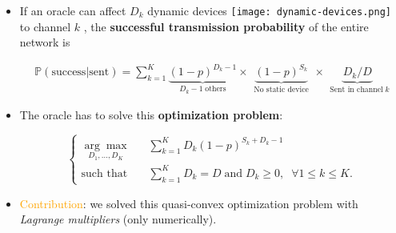 \begin{frameO}

    \begin{itemize}
        \item
              If an oracle can affect \(D_k\) dynamic devices \texttt{[image: dynamic-devices.png]}  to channel
              \(k\) \slotmachine{}, the \textbf{successful transmission probability} of the entire network is
              \vspace*{-5pt}
              \begin{small} \begin{align*}
                      \mathbb{P}(\text{success}|\text{sent}) = \sum_{k=1}^{K} \underbrace{(1 - p)^{D_k - 1}}_{\;\;D_k - 1 \;\text{others}\;\;} \times \underbrace{(1 - p)^{S_k}}_{\;\;\text{No static device}\;\;} \times \underbrace{ D_k / D }_{\;\;\text{Sent in channel}\; k}
                  \end{align*} \end{small}
              \pause
        \item
              The oracle has to solve this \textbf{optimization problem}:
              \vspace*{-5pt}
              \begin{small} \begin{equation*} \begin{cases}
                          \underset{D_1,\dots,D_{K}}{\arg\max}\;\;\; & \sum\limits_{k=1}^{K} D_k (1 - p)^{S_k + D_k -1}                                           \\
                          \text{such that}\;\;\;                     & \sum\limits_{k=1}^{K} D_k = D \; \text{and} \; D_k \geq 0, \; \; \forall 1 \leq k \leq K .
                      \end{cases} \end{equation*} \end{small}
        \vspace*{15pt}
        \item
              \textcolor{orange}{Contribution}: we solved this quasi-convex optimization problem with \emph{Lagrange
                  multipliers} (only numerically).
    \end{itemize}

\end{frameO}

